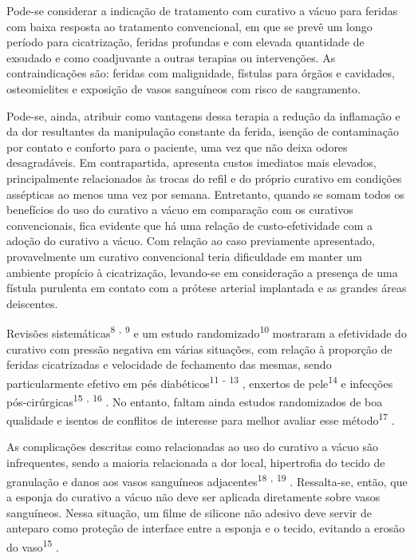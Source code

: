 \documentclass[numberinsection,times,10pt,spreadimages]{memoir}
\begin{document}
Pode-se considerar a indicação de tratamento com curativo a vácuo para feridas
com
baixa resposta ao tratamento convencional, em que se prevê um longo período para
cicatrização, feridas profundas e com elevada quantidade de exsudado e como
coadjuvante a outras terapias ou intervenções. As contraindicações são: feridas
com
malignidade, fístulas para órgãos e cavidades, osteomielites e exposição de
vasos
sanguíneos com risco de sangramento.

Pode-se, ainda, atribuir como vantagens dessa terapia a redução da inflamação e
da
dor resultantes da manipulação constante da ferida, isenção de contaminação por
contato e conforto para o paciente, uma vez que não deixa odores desagradáveis.
Em
contrapartida, apresenta custos imediatos mais elevados, principalmente
relacionados
às trocas do refil e do próprio curativo em condições assépticas ao menos uma
vez
por semana. Entretanto, quando se somam todos os benefícios do uso do curativo a
vácuo em comparação com os curativos convencionais, fica evidente que há uma
relação
de custo-efetividade com a adoção do curativo a vácuo. Com relação ao caso
previamente apresentado, provavelmente um curativo convencional teria
dificuldade em
manter um ambiente propício à cicatrização, levando-se em consideração a
presença de
uma fístula purulenta em contato com a prótese arterial implantada e as grandes
áreas deiscentes.

Revisões sistemáticas\textsuperscript{8}
\textsuperscript{,}
\textsuperscript{9}
e um estudo randomizado\textsuperscript{10}
mostraram a efetividade do curativo com pressão
negativa em várias situações, com relação à proporção de feridas cicatrizadas e
velocidade de fechamento das mesmas, sendo particularmente efetivo em pés
diabéticos\textsuperscript{11}
\textsuperscript{-}
\textsuperscript{13}
, enxertos de pele\textsuperscript{14}
e infecções pós-cirúrgicas\textsuperscript{15}
\textsuperscript{,}
\textsuperscript{16}
. No entanto, faltam ainda estudos randomizados
de boa qualidade e isentos de conflitos de interesse para melhor avaliar esse
método\textsuperscript{17}
.

As complicações descritas como relacionadas ao uso do curativo a vácuo são
infrequentes, sendo a maioria relacionada a dor local, hipertrofia do tecido de
granulação e danos aos vasos sanguíneos adjacentes\textsuperscript{18}
\textsuperscript{,}
\textsuperscript{19}
. Ressalta-se, então, que a esponja do curativo a vácuo
não deve ser aplicada diretamente sobre vasos sanguíneos. Nessa situação, um
filme
de silicone não adesivo deve servir de anteparo como proteção de interface entre
a
esponja e o tecido, evitando a erosão do vaso\textsuperscript{15}
.
\end{document}
